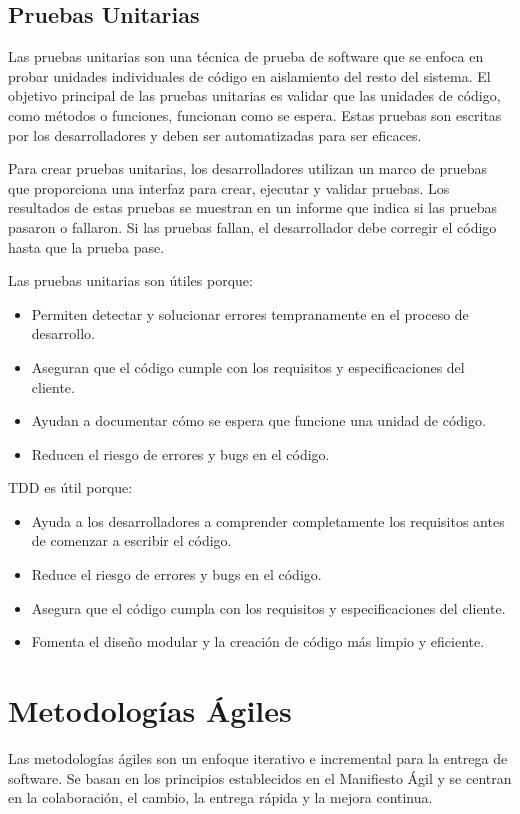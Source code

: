 \documentclass[executivepaper]{article}
\begin{document}
\subsection{Pruebas Unitarias}

Las pruebas unitarias son una técnica de prueba de software que se enfoca en probar unidades individuales de código en aislamiento del resto del sistema. El objetivo principal de las pruebas unitarias es validar que las unidades de código, como métodos o funciones, funcionan como se espera. Estas pruebas son escritas por los desarrolladores y deben ser automatizadas para ser eficaces.

Para crear pruebas unitarias, los desarrolladores utilizan un marco de pruebas que proporciona una interfaz para crear, ejecutar y validar pruebas. Los resultados de estas pruebas se muestran en un informe que indica si las pruebas pasaron o fallaron. Si las pruebas fallan, el desarrollador debe corregir el código hasta que la prueba pase.

Las pruebas unitarias son útiles porque:

\begin{itemize}
\item Permiten detectar y solucionar errores tempranamente en el proceso de desarrollo.
\item Aseguran que el código cumple con los requisitos y especificaciones del cliente.
\item Ayudan a documentar cómo se espera que funcione una unidad de código.
\item Reducen el riesgo de errores y bugs en el código.
\end{itemize}

TDD es útil porque:

\begin{itemize}
\item Ayuda a los desarrolladores a comprender completamente los requisitos antes de comenzar a escribir el código.
\item Reduce el riesgo de errores y bugs en el código.
\item Asegura que el código cumpla con los requisitos y especificaciones del cliente.
\item Fomenta el diseño modular y la creación de código más limpio y eficiente.
\end{itemize}

\newpage
\section{Metodologías Ágiles}
Las metodologías ágiles son un enfoque iterativo e incremental para la entrega de software. Se basan en los principios establecidos en el Manifiesto Ágil y se centran en la colaboración, el cambio, la entrega rápida y la mejora continua.
\end{document}
